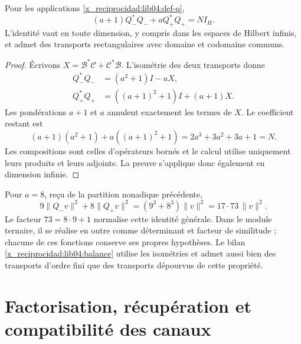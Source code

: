 \begin{theorem}
\label{x_reciprocidad:lib04:teo-balance}
Pour les applications \eqref{x_reciprocidad:lib04:def-q},
\begin{equation}
 (a+1)Q_-^*Q_-+aQ_+^*Q_+=NI_H.
 \label{x_reciprocidad:lib04:balance}
\end{equation}
L'identité vaut en toute dimension, y compris dans les espaces de Hilbert infinis, et admet des transports rectangulaires avec domaine et codomaine communs.
\end{theorem}

\begin{proof}
Écrivons \(X=\mathcal B^*\mathcal C+\mathcal C^*\mathcal B\).
L’isométrie des deux transports donne
\begin{align*}
 Q_-^*Q_-&=(a^2+1)I-aX,\\
 Q_+^*Q_+&=((a+1)^2+1)I+(a+1)X.
\end{align*}
Les pondérations \(a+1\) et \(a\) annulent exactement les termes
de \(X\). Le coefficient restant est
\[
 (a+1)(a^2+1)+a((a+1)^2+1)
 =2a^3+3a^2+3a+1=N.
\]
Les compositions sont celles d’opérateurs bornés et le calcul utilise
uniquement leurs produits et leurs adjoints. La preuve s’applique donc
également en dimension infinie.
\end{proof}

Pour \(a=8\), reçu de la partition nonadique précédente,
\begin{equation}
 9\|Q_-v\|^2+8\|Q_+v\|^2
 =(9^3+8^3)\|v\|^2=17\cdot73\,\|v\|^2.
 \label{x_reciprocidad:lib04:balance-canonico}
\end{equation}
Le facteur \(73=8\cdot9+1\) normalise cette identité générale. Dans le module ternaire, il se réalise en outre comme déterminant et facteur de similitude ; chacune de ces fonctions conserve ses propres hypothèses. Le bilan \eqref{x_reciprocidad:lib04:balance} utilise les isométries et admet aussi bien des transports d'ordre fini que des transports dépourvus de cette propriété.

\section{Factorisation, récupération et compatibilité des canaux}
\label{x_reciprocidad:lib04:factorizacion}

